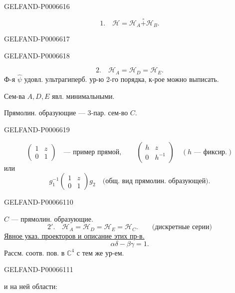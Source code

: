 \begin{GelfandAdjacentEvidence}{GELFAND-P000661}{6}

\[
1.\quad \mathcal H=\mathcal H_A\overset{\circ}{+}\mathcal H_B.
\]
\end{GelfandAdjacentEvidence}
\begin{GelfandAdjacentEvidence}{GELFAND-P000661}{7}

\end{GelfandAdjacentEvidence}
\begin{GelfandAdjacentEvidence}{GELFAND-P000661}{8}

\[
2.\quad \mathcal H_A=\mathcal H_D=\mathcal H_E.
\]
Ф-я \(\widehat\psi\) удовл. ультрагиперб. ур-ю 2-го порядка, к-рое можно выписать.

Сем-ва \(A,D,E\) явл. минимальными.

Прямолин. образующие --- 3-пар. сем-во \(C\).
\end{GelfandAdjacentEvidence}
\begin{GelfandAdjacentEvidence}{GELFAND-P000661}{9}

\[
\begin{pmatrix}1&z\\0&1\end{pmatrix}
\quad\text{--- пример прямой},\qquad
\begin{pmatrix}h&z\\0&h^{-1}\end{pmatrix}
\quad(h\text{ --- фиксир.})
\]
или
\[
g_1^{-1}\begin{pmatrix}1&z\\0&1\end{pmatrix}g_2
\quad\text{(общ. вид прямолин. образующей)}.
\]
\end{GelfandAdjacentEvidence}
\begin{GelfandAdjacentEvidence}{GELFAND-P000661}{10}


\(C\) --- прямолин. образующие.
\[
2'.\quad \mathcal H_A=\mathcal H_D=\mathcal H_E=\mathcal H_C.
\qquad\text{(дискретные серии)}
\]
\underline{Явное указ. проекторов и описание этих пр-в.}
\[
\alpha\delta-\beta\gamma=1.
\]
Рассм. соотв. пов. в \(\mathbb C^4\) с тем же ур-ем.
\end{GelfandAdjacentEvidence}
\begin{GelfandAdjacentEvidence}{GELFAND-P000661}{11}


и на ней области:
\end{GelfandAdjacentEvidence}



